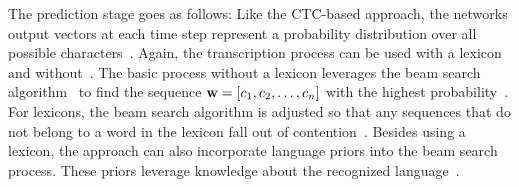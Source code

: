 The prediction stage goes as follows:
Like the \ac{CTC}-based approach, the networks output vectors at each time step represent a
probability distribution over all possible characters~\citep{ghosh_visual_2017}.
Again, the transcription process can be used with a lexicon and without~\citep{ghosh_visual_2017}.
The basic process without a lexicon leverages the beam search algorithm~\citep{ghosh_visual_2017}
to find the sequence $\textbf{w}=[c_1,c_2,\ldots,c_n]$ with the highest
probability~\citep{ghosh_visual_2017}.
For lexicons, the beam search algorithm is adjusted so that any sequences that do not belong
to a word in the lexicon fall out of contention~\citep{ghosh_visual_2017}.
Besides using a lexicon, the approach can also incorporate language priors into
the beam search process.
These priors leverage knowledge about the recognized language~\citep{ghosh_visual_2017}.

